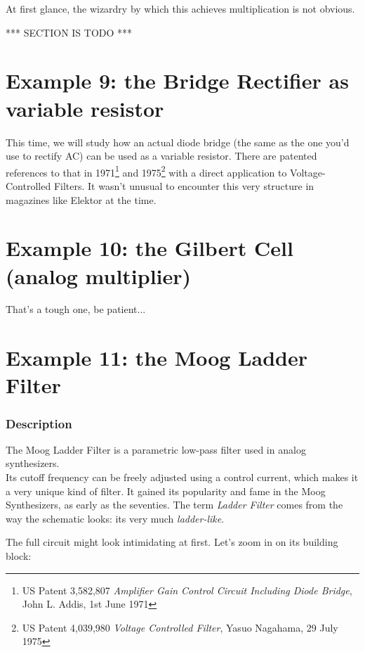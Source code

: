 \documentclass[10pt]{article}
\begin{document}
At first glance, the wizardry by which this achieves multiplication is not obvious.

*** SECTION IS TODO ***



\section*{Example 9: the Bridge Rectifier as variable resistor}

This time, we will study how an actual diode bridge (the same as the one you'd use to rectify AC) can be used as a variable resistor. There are patented references to that in 1971\footnote{US Patent 3,582,807 \textit{Amplifier Gain Control Circuit Including Diode Bridge}, John L. Addis, 1st June 1971} and 1975\footnote{US Patent 4,039,980 \textit{Voltage Controlled Filter}, Yasuo Nagahama, 29 July 1975} with a direct application to Voltage-Controlled Filters. It wasn't unusual to encounter this very structure in magazines like Elektor at the time.





\section*{Example 10: the Gilbert Cell (analog multiplier)}
That's a tough one, be patient...




\section*{Example 11: the Moog Ladder Filter}

\subsubsection*{Description}
The Moog Ladder Filter is a parametric low-pass filter used in analog synthesizers.\\

Its cutoff frequency can be freely adjusted using a control current, which makes it a very unique kind of filter.
It gained its popularity and fame in the Moog Synthesizers, as early as the seventies. 
The term \textit{Ladder Filter} comes from the way the schematic looks: its very much \textit{ladder-like}. 

The full circuit might look intimidating at first. Let's zoom in on its building block:
\end{document}
